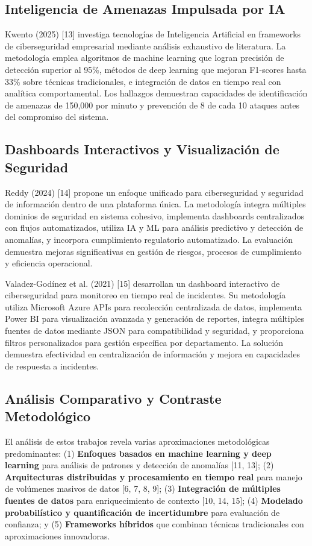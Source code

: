 \subsection{Inteligencia de Amenazas Impulsada por IA}

Kwento (2025) [13] investiga tecnologías de Inteligencia Artificial en frameworks de ciberseguridad empresarial mediante análisis exhaustivo de literatura. La metodología emplea algoritmos de machine learning que logran precisión de detección superior al 95\%, métodos de deep learning que mejoran F1-scores hasta 33\% sobre técnicas tradicionales, e integración de datos en tiempo real con analítica comportamental. Los hallazgos demuestran capacidades de identificación de amenazas de 150,000 por minuto y prevención de 8 de cada 10 ataques antes del compromiso del sistema.

\subsection{Dashboards Interactivos y Visualización de Seguridad}

Reddy (2024) [14] propone un enfoque unificado para ciberseguridad y seguridad de información dentro de una plataforma única. La metodología integra múltiples dominios de seguridad en sistema cohesivo, implementa dashboards centralizados con flujos automatizados, utiliza IA y ML para análisis predictivo y detección de anomalías, y incorpora cumplimiento regulatorio automatizado. La evaluación demuestra mejoras significativas en gestión de riesgos, procesos de cumplimiento y eficiencia operacional.

Valadez-Godínez et al. (2021) [15] desarrollan un dashboard interactivo de ciberseguridad para monitoreo en tiempo real de incidentes. Su metodología utiliza Microsoft Azure APIs para recolección centralizada de datos, implementa Power BI para visualización avanzada y generación de reportes, integra múltiples fuentes de datos mediante JSON para compatibilidad y seguridad, y proporciona filtros personalizados para gestión específica por departamento. La solución demuestra efectividad en centralización de información y mejora en capacidades de respuesta a incidentes.

\subsection{Análisis Comparativo y Contraste Metodológico}

El análisis de estos trabajos revela varias aproximaciones metodológicas predominantes: (1) \textbf{Enfoques basados en machine learning y deep learning} para análisis de patrones y detección de anomalías [11, 13]; (2) \textbf{Arquitecturas distribuidas y procesamiento en tiempo real} para manejo de volúmenes masivos de datos [6, 7, 8, 9]; (3) \textbf{Integración de múltiples fuentes de datos} para enriquecimiento de contexto [10, 14, 15]; (4) \textbf{Modelado probabilístico y quantificación de incertidumbre} para evaluación de confianza; y (5) \textbf{Frameworks híbridos} que combinan técnicas tradicionales con aproximaciones innovadoras.

